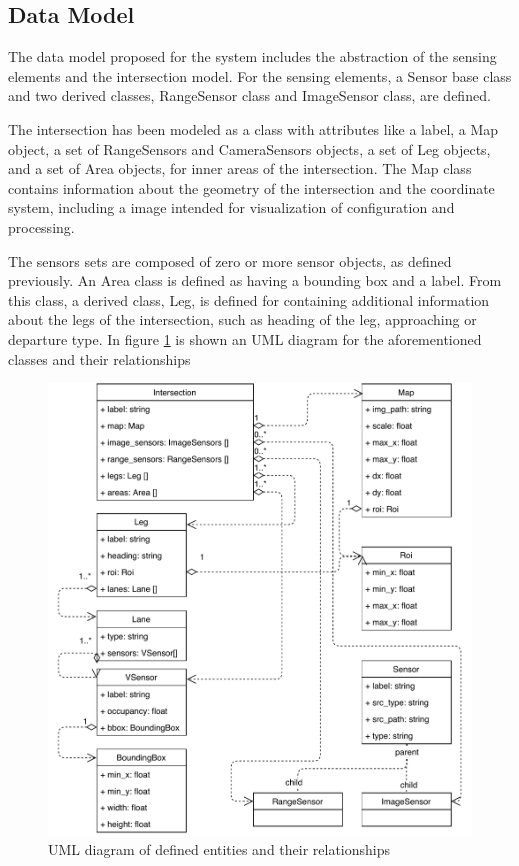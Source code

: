 
\subsection{Data Model}

The data model proposed for the system includes the abstraction of the sensing elements and the intersection model. For the sensing elements, a Sensor base class and two derived classes, RangeSensor class and ImageSensor class, are defined. 

The intersection has been modeled as a class with attributes like a label, a Map object, a set of RangeSensors and CameraSensors objects, a set of Leg objects, and a set of Area objects, for inner areas of the intersection. The Map class contains information about the geometry of the intersection and the coordinate system, including a image intended for visualization of configuration and processing.

The sensors sets are composed of zero or more sensor objects, as defined previously. An Area class is defined as having a bounding box and a label. From this class, a derived class, Leg, is defined for containing additional information about the legs of the intersection, such as heading of the leg, approaching or departure type. In figure \ref{data_model} is shown an UML diagram for the aforementioned classes and their relationships

\begin{figure}[ht!]
\centering
\includegraphics[scale=0.75]{fig/3/data_modelA.pdf}
\caption{UML diagram of defined entities and their relationships}
\label{data_model}
\end{figure}

